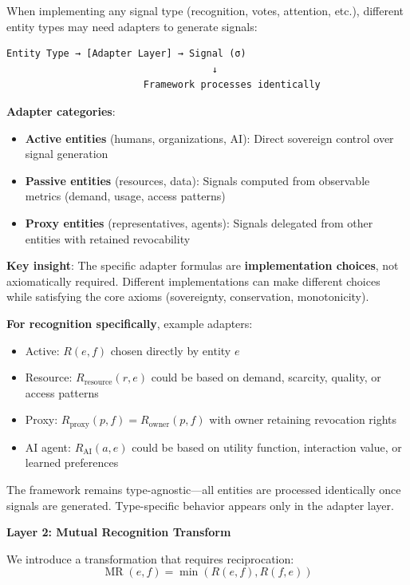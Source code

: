 \documentclass[11pt,a4paper]{article}
\theoremstyle{definition}
\theoremstyle{remark}
\DeclareMathOperator{\MR}{MR}
\begin{document}
When implementing any signal type (recognition, votes, attention, etc.), different entity types may need adapters to generate signals:

\begin{center}
\begin{verbatim}
Entity Type → [Adapter Layer] → Signal (σ)
                                    ↓
                        Framework processes identically
\end{verbatim}
\end{center}

\textbf{Adapter categories}:
\begin{itemize}
\item \textbf{Active entities} (humans, organizations, AI): Direct sovereign control over signal generation
\item \textbf{Passive entities} (resources, data): Signals computed from observable metrics (demand, usage, access patterns)
\item \textbf{Proxy entities} (representatives, agents): Signals delegated from other entities with retained revocability
\end{itemize}

\textbf{Key insight}: The specific adapter formulas are \textbf{implementation choices}, not axiomatically required. Different implementations can make different choices while satisfying the core axioms (sovereignty, conservation, monotonicity).

\textbf{For recognition specifically}, example adapters:
\begin{itemize}
\item Active: $R(e,f)$ chosen directly by entity $e$
\item Resource: $R_{\text{resource}}(r,e)$ could be based on demand, scarcity, quality, or access patterns
\item Proxy: $R_{\text{proxy}}(p,f) = R_{\text{owner}}(p,f)$ with owner retaining revocation rights
\item AI agent: $R_{\text{AI}}(a,e)$ could be based on utility function, interaction value, or learned preferences
\end{itemize}

The framework remains type-agnostic—all entities are processed identically once signals are generated. Type-specific behavior appears only in the adapter layer.

\textbf{Layer 2: Mutual Recognition Transform}

We introduce a transformation that requires reciprocation:
\[ \MR(e,f) = \min(R(e,f), R(f,e)) \]
\end{document}
